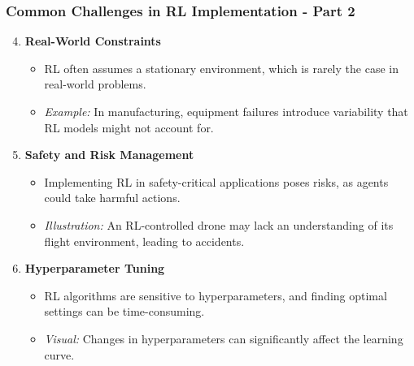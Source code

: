 \documentclass[aspectratio=169]{beamer}
\begin{document}
\begin{frame}[fragile]
    \frametitle{Common Challenges in RL Implementation - Part 2}
    \begin{enumerate}
        \setcounter{enumi}{3}
        \item \textbf{Real-World Constraints}
        \begin{itemize}
            \item RL often assumes a stationary environment, which is rarely the case in real-world problems.
            \item \textit{Example:} In manufacturing, equipment failures introduce variability that RL models might not account for.
        \end{itemize}
        
        \item \textbf{Safety and Risk Management}
        \begin{itemize}
            \item Implementing RL in safety-critical applications poses risks, as agents could take harmful actions.
            \item \textit{Illustration:} An RL-controlled drone may lack an understanding of its flight environment, leading to accidents.
        \end{itemize}
        
        \item \textbf{Hyperparameter Tuning}
        \begin{itemize}
            \item RL algorithms are sensitive to hyperparameters, and finding optimal settings can be time-consuming.
            \item \textit{Visual:} Changes in hyperparameters can significantly affect the learning curve.
        \end{itemize}
    \end{enumerate}
\end{frame}
\end{document}
